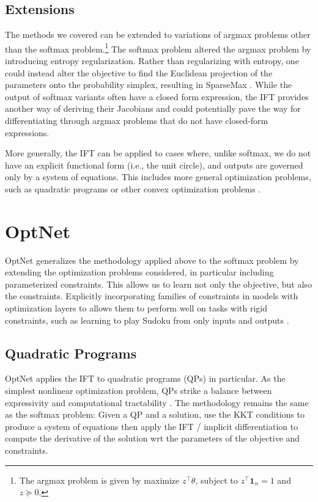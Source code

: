 \documentclass[11pt]{article}
\begin{document}
\subsection{Extensions}
The methods we covered can be extended to variations of argmax problems
other than the softmax problem.\footnote{
The argmax problem is given by maximize $z^\top \theta$, subject to $z^\top\mathbf{1}_n=1$
and $z\succeq 0$.
}
The softmax problem altered the argmax problem by introducing entropy regularization.
Rather than regularizing with entropy, one could instead alter the objective to find
the Euclidean projection of the parameters onto the probability simplex,
resulting in SparseMax \citep{sparsemax}.
While the output of softmax variants often have a closed form expression,
the IFT provides another way of deriving their Jacobians
and could potentially pave the way for differentiating through argmax problems
that do not have closed-form expressions.

More generally, the IFT can be applied to cases where, unlike softmax,
we do not have an explicit functional form (i.e., the unit circle),
and outputs are governed only by a system of equations.
This includes more general optimization problems, such as quadratic programs \citep{optnet}
or other convex optimization problems \citep{agrawal2019diffcvx}.

\section{OptNet}
OptNet generalizes the methodology applied above to the softmax problem by
extending the optimization problems considered,
in particular including parameterized constraints.
This allows us to learn not only the objective, but also the constraints.
Explicitly incorporating families of constraints in models
with optimization layers to allows them to perform well
on tasks with rigid constraints, such as learning to play
Sudoku from only inputs and outputs \citep{optnet}.

\subsection{Quadratic Programs}
OptNet applies the IFT to quadratic programs (QPs) in particular.
As the simplest nonlinear optimization problem,
QPs strike a balance between expressivity and computational tractability \citep{simplex}.
The methodology remains the same as the softmax problem:
Given a QP and a solution,
use the KKT conditions to produce a system of equations then apply the IFT
/ implicit differentiation to compute the derivative of the solution wrt the
parameters of the objective and constraints.
\end{document}
